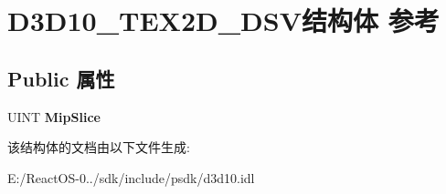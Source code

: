 \hypertarget{struct_d3_d10___t_e_x2_d___d_s_v}{}\section{D3\+D10\+\_\+\+T\+E\+X2\+D\+\_\+\+D\+S\+V结构体 参考}
\label{struct_d3_d10___t_e_x2_d___d_s_v}
\subsection*{Public 属性}
\begin{DoxyCompactItemize}
\item 
\mbox{\label{struct_d3_d10___t_e_x2_d___d_s_v_adc0cd1c85d565c7a32ec00ba2ad7d164}} 
U\+I\+NT {\bfseries Mip\+Slice}
\end{DoxyCompactItemize}


该结构体的文档由以下文件生成\+:\begin{DoxyCompactItemize}
\item 
E\+:/\+React\+O\+S-\/0../sdk/include/psdk/d3d10.\+idl\end{DoxyCompactItemize}
